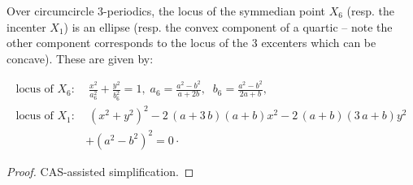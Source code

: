 \begin{proposition}
Over circumcircle 3-periodics, the locus of the symmedian point $X_6$ (resp. the incenter $X_1$) is an ellipse (resp. the convex component of a quartic -- note the other component corresponds to the locus of the 3 excenters which can be concave). These are given by:

\begin{align*}
\text{locus of $X_6$}: &\; \frac{x^2}{a_6^2}+\frac{y^2}{b_6^2}=1, \; a_6=\frac{ a^2 - b^2}{a + 2 b},\;\;  b_6=\frac{ a^2 - b^2}{2a +  b},\\
\text{locus of $X_1$}:&\; \left( {x}^{2}+{y}^{2} \right) ^{2}-2\, \left( a+3\,b \right) 
 \left( a+b \right) {x}^{2}-2\, \left( a+b \right)  \left( 3\,a+b
 \right) {y}^{2} \\
 &+\left( a^2-b^2 \right) ^{2}=0\cdot
 \label{thm:II-loci_X1}
\end{align*}
\end{proposition}

\begin{proof}
CAS-assisted simplification.
\end{proof}

